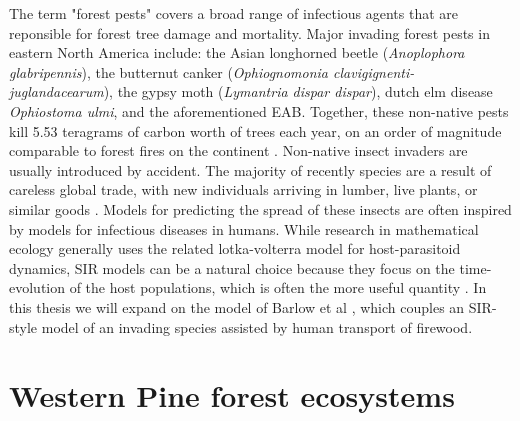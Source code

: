 The term "forest pests" covers a broad range of infectious agents that are reponsible for forest tree damage and mortality. Major invading forest pests in eastern North America include: the Asian longhorned beetle (\textit{Anoplophora glabripennis}), the butternut canker (\textit{Ophiognomonia clavigignenti-juglandacearum}), the gypsy moth (\textit{Lymantria dispar dispar}), dutch elm disease \textit{Ophiostoma ulmi}, and the aforementioned EAB. Together, these non-native pests kill 5.53 teragrams of carbon worth of trees each year, on an order of magnitude comparable to forest fires on the continent \cite{fei2019biomass}. Non-native insect invaders are usually introduced by accident. The majority of recently species are a result of careless global trade, with new individuals arriving in lumber, live plants, or similar goods \cite{brockerhoff2017ecology}. Models for predicting the spread of these insects are often inspired by models for infectious diseases in humans. While research in mathematical ecology generally uses the related lotka-volterra model for host-parasitoid dynamics, SIR models can be a natural choice because they focus on the time-evolution of the host populations, which is often the more useful quantity \cite{edelstein2005mathematical}. In this thesis we will expand on the model of Barlow et al \cite{barlow2014modelling}, which couples an SIR-style model of an invading species assisted by human transport of firewood.

\section{Western Pine forest ecosystems}













